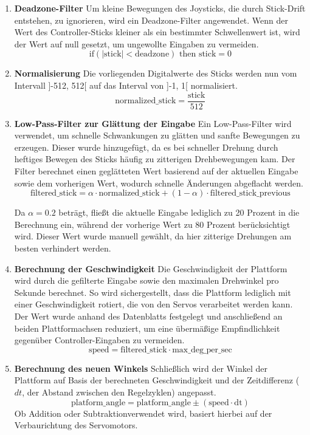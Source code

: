 \begin{enumerate}
    \item \textbf{Deadzone-Filter} \newline
    Um kleine Bewegungen des Joysticks, die durch Stick-Drift entstehen, zu ignorieren, wird ein Deadzone-Filter angewendet.
    Wenn der Wert des Controller-Sticks kleiner als ein bestimmter Schwellenwert ist, wird der Wert auf null gesetzt, um ungewollte Eingaben zu vermeiden.
    \[
    \text{if} \left( |\text{stick}| < \text{deadzone} \right) \text{ then stick} = 0
    \]

    \item \textbf{Normalisierung} \newline
    Die vorliegenden Digitalwerte des Sticks werden nun vom Intervall ]-512, 512[ auf das Interval von ]-1, 1[ normalisiert.
    \[
    \text{normalized\_stick} = \frac{\text{stick}}{512}
    \]

    \item \textbf{Low-Pass-Filter zur Glättung der Eingabe} \newline
    Ein Low-Pass-Filter wird verwendet, um schnelle Schwankungen zu glätten und sanfte Bewegungen zu erzeugen. 
    Dieser wurde hinzugefügt, da es bei schneller Drehung durch heftiges Bewegen des Sticks häufig zu zitterigen Drehbewegungen kam.
    Der Filter berechnet einen geglätteten Wert basierend auf der aktuellen Eingabe sowie dem vorherigen Wert, wodurch schnelle Änderungen abgeflacht werden.
    \[
    \text{filtered\_stick} = \alpha \cdot \text{normalized\_stick} + (1 - \alpha) \cdot \text{filtered\_stick\_previous}
    \]

    Da \( \alpha = 0.2 \) beträgt, fließt die aktuelle Eingabe lediglich zu 20 Prozent in die Berechnung ein, während der vorherige Wert zu 80 Prozent berücksichtigt wird. 
    Dieser Wert wurde manuell gewählt, da hier zitterige Drehungen am besten verhindert werden.

    \item \textbf{Berechnung der Geschwindigkeit} \newline
    Die Geschwindigkeit der Plattform wird durch die gefilterte Eingabe sowie den maximalen Drehwinkel pro Sekunde berechnet. 
    So wird sichergestellt, dass die Plattform lediglich mit einer Geschwindigkeit rotiert, die von den Servos verarbeitet werden kann. 
    Der Wert wurde anhand des Datenblatts \cite{esp_platform_servo} festgelegt und anschließend an beiden Plattformachsen reduziert, um eine übermäßige Empfindlichkeit gegenüber Controller-Eingaben zu vermeiden.
    \[
    \text{speed} = \text{filtered\_stick} \cdot \text{max\_deg\_per\_sec}
    \]

    \item \textbf{Berechnung des neuen Winkels} \newline
    Schließlich wird der Winkel der Plattform auf Basis der berechneten Geschwindigkeit und der Zeitdifferenz ($dt$, der Abstand zwischen den Regelzyklen) angepasst. 
    \[
    \text{platform\_angle} = \text{platform\_angle} \pm (\text{speed} \cdot \text{dt})
    \]
    Ob Addition oder Subtraktionverwendet wird, basiert hierbei auf der Verbaurichtung des Servomotors.
\end{enumerate}

